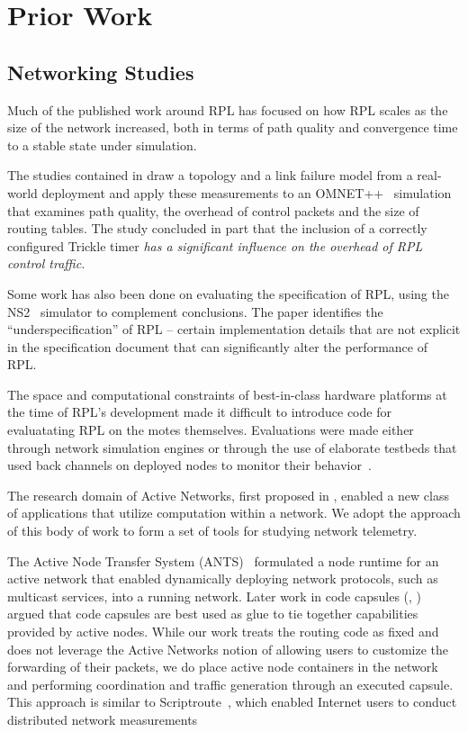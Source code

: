 \section{Prior Work}

\subsection{Networking Studies}
Much of the published work around RPL has focused on how RPL scales as the size
of the network increased, both in terms of path quality and convergence time to
a stable state under simulation. 

The studies contained in \cite{tripathi2010performance} draw a topology and a
link failure model from a real-world deployment and apply these measurements to
an OMNET++~\cite{omnet++} simulation that examines path quality, the overhead
of control packets and the size of routing tables. The study concluded in part
that the inclusion of a correctly configured Trickle timer \emph{has a significant influence
on the overhead of RPL control traffic.}

Some work \cite{clausen2011critical} has also been done on evaluating the
specification of RPL, using the NS2~\cite{ns2} simulator to complement
conclusions. The paper identifies the ``underspecification'' of RPL -- certain
implementation details that are not explicit in the specification document that
can significantly alter the performance of RPL.

The space and computational constraints of best-in-class hardware platforms at
the time of RPL's development made it difficult to introduce code for
evaluatating RPL on the motes themselves. Evaluations were made either through
network simulation engines or through the use of elaborate testbeds that used
back channels on deployed nodes to monitor their
behavior~\cite{fonseca2008tracking}. 

The research domain of Active Networks, first proposed in
\cite{tennenhouse2002towards}, enabled a new class of applications that utilize
computation within a network. We adopt the approach of this body of work to
form a set of tools for studying network telemetry.

The Active Node Transfer System (ANTS)~\cite{wetherall1998ants} formulated a
node runtime for an active network that enabled dynamically deploying network
protocols, such as multicast services, into a running network. Later work in
code capsules (\cite{tennenhouse1997survey}, \cite{wetherall2002active}) argued
that code capsules are best used as glue to tie together capabilities provided
by active nodes. While our work treats the routing code as fixed and does not
leverage the Active Networks notion of allowing users to customize the
forwarding of their packets, we do place active node containers in the network
and performing coordination and traffic generation through an executed capsule.
This approach is similar to Scriptroute~\cite{spring2003scriptroute}, which
enabled Internet users to conduct distributed network measurements

